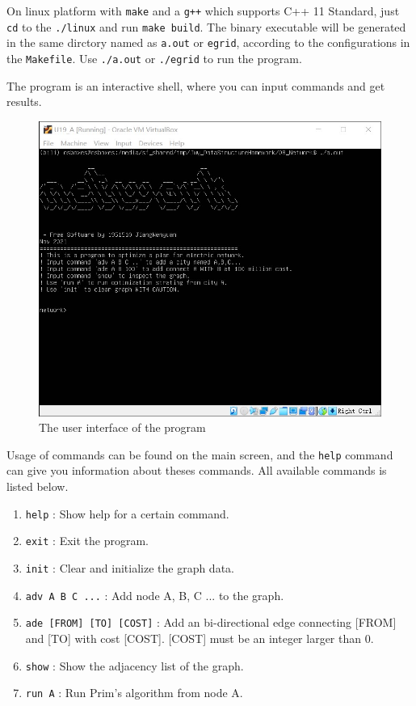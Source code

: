 \documentclass[cn,black,12pt,normal]{elegantnote}
\begin{document}
On linux platform with \lstinline{make} and a \lstinline{g++} which supports C++ 11 Standard, just \lstinline{cd} to the \lstinline{./linux} and run \lstinline{make build}. The binary executable will be generated in the same dirctory named as \lstinline{a.out} or \lstinline{egrid}, according to the configurations in the \lstinline{Makefile}. Use \lstinline{./a.out} or \lstinline{./egrid} to run the program.

The program is an interactive shell, where you can input commands and get results.

\begin{figure}[H]
    \centering
    \includegraphics[width=0.7\linewidth]{image/grid_01.jpg}
    \caption{The user interface of the program}
\end{figure}

Usage of commands can be found on the main screen, and the \lstinline{help} command can give you information about theses commands.  All available commands is listed below.

\begin{enumerate}
    \item \lstinline{help} : Show help for a certain command.
    \item \lstinline{exit} : Exit the program.
    \item \lstinline{init} : Clear and initialize the graph data.
    \item \lstinline{adv A B C ...} : Add node A, B, C ... to the graph.
    \item \lstinline{ade [FROM] [TO] [COST]} : Add an bi-directional edge connecting [FROM] and [TO] with cost [COST]. [COST] must be an integer larger than 0.
    \item \lstinline{show} : Show the adjacency list of the graph.
    \item \lstinline{run A} : Run Prim's algorithm from node A.
\end{enumerate}
\end{document}
